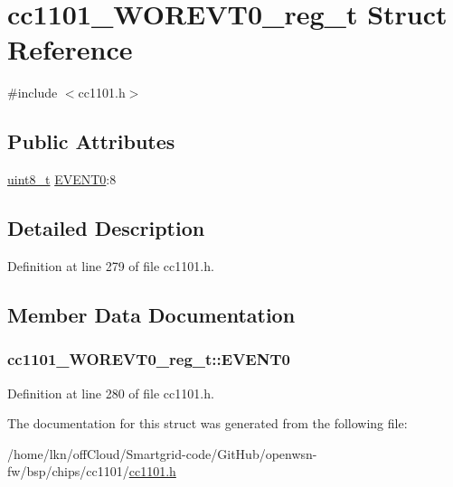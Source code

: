 \hypertarget{structcc1101___w_o_r_e_v_t0__reg__t}{}\section{cc1101\+\_\+\+W\+O\+R\+E\+V\+T0\+\_\+reg\+\_\+t Struct Reference}
\label{structcc1101___w_o_r_e_v_t0__reg__t}


{\ttfamily \#include $<$cc1101.\+h$>$}

\subsection*{Public Attributes}
\begin{DoxyCompactItemize}
\item 
\hyperlink{_p_e___types_8h_aba7bc1797add20fe3efdf37ced1182c5}{uint8\+\_\+t} \hyperlink{structcc1101___w_o_r_e_v_t0__reg__t_ab15d06d730d512ee3091bb0bf39dd30e}{E\+V\+E\+N\+T0}\+:8
\end{DoxyCompactItemize}


\subsection{Detailed Description}


Definition at line 279 of file cc1101.\+h.



\subsection{Member Data Documentation}
\subsubsection[{\texorpdfstring{E\+V\+E\+N\+T0}{EVENT0}}]{ cc1101\+\_\+\+W\+O\+R\+E\+V\+T0\+\_\+reg\+\_\+t\+::\+E\+V\+E\+N\+T0}\hypertarget{structcc1101___w_o_r_e_v_t0__reg__t_ab15d06d730d512ee3091bb0bf39dd30e}{}\label{structcc1101___w_o_r_e_v_t0__reg__t_ab15d06d730d512ee3091bb0bf39dd30e}


Definition at line 280 of file cc1101.\+h.



The documentation for this struct was generated from the following file\+:\begin{DoxyCompactItemize}
\item 
/home/lkn/off\+Cloud/\+Smartgrid-\/code/\+Git\+Hub/openwsn-\/fw/bsp/chips/cc1101/\hyperlink{cc1101_8h}{cc1101.\+h}\end{DoxyCompactItemize}
